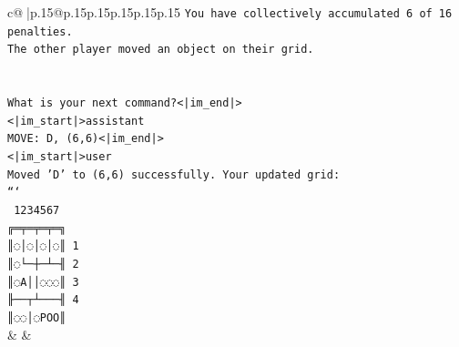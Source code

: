\documentclass{article}
\begin{document}
{\begin{supertabular}{c@{$\;$}|p{.15\linewidth}@{}p{.15\linewidth}p{.15\linewidth}p{.15\linewidth}p{.15\linewidth}p{.15\linewidth}}
{{{\texttt{You have collectively accumulated 6 of 16 penalties.} \\
\texttt{The other player moved an object on their grid.} \\
\\ 
\\ 
\texttt{What is your next command?<|im\_end|>} \\
\texttt{<|im\_start|>assistant} \\
\texttt{MOVE: D, (6,6)<|im\_end|>} \\
\texttt{<|im\_start|>user} \\
\texttt{Moved 'D' to (6,6) successfully. Your updated grid:} \\
\texttt{```} \\
\texttt{ 1234567} \\
\texttt{╔═╤═╤═╤═╗} \\
\texttt{║◌│◌│◌│◌║ 1} \\
\texttt{║◌└─┼─┴─╢ 2} \\
\texttt{║◌A││◌◌◌║ 3} \\
\texttt{╟──┬┴───╢ 4} \\
\texttt{║◌◌│◌POO║} \\
            }
        }
    }
    & & \\ \\


\end{supertabular}}
\end{document}
